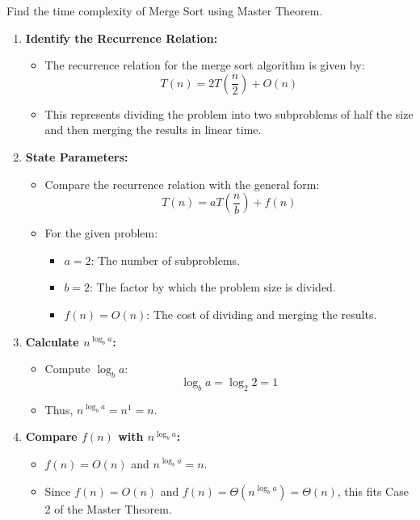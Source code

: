     \begin{example}
        Find the time complexity of Merge Sort using Master Theorem.
        \begin{enumerate}
            \item \textbf{Identify the Recurrence Relation:}
            \begin{itemize}
                \item The recurrence relation for the merge sort algorithm is given by:
                \[
                T(n) = 2T\left(\frac{n}{2}\right) + O(n)
                \]
                \item This represents dividing the problem into two subproblems of half the size and then merging the results in linear time.
            \end{itemize}
        
            \item \textbf{State Parameters:}
            \begin{itemize}
                \item Compare the recurrence relation with the general form:
                \[
                T(n) = aT\left(\frac{n}{b}\right) + f(n)
                \]
                \item For the given problem:
                \begin{itemize}
                    \item \( a = 2 \): The number of subproblems.
                    \item \( b = 2 \): The factor by which the problem size is divided.
                    \item \( f(n) = O(n) \): The cost of dividing and merging the results.
                \end{itemize}
            \end{itemize}
        
            \item \textbf{Calculate \( n^{\log_b a} \):}
            \begin{itemize}
                \item Compute \( \log_b a \):
                \[
                \log_b a = \log_2 2 = 1
                \]
                \item Thus, \( n^{\log_b a} = n^1 = n \).
            \end{itemize}
        
            \item \textbf{Compare \( f(n) \) with \( n^{\log_b a} \):}
            \begin{itemize}
                \item \( f(n) = O(n) \) and \( n^{\log_b a} = n \).
                \item Since \( f(n) = O(n) \) and \( f(n) = \Theta(n^{\log_b a}) = \Theta(n) \), this fits Case 2 of the Master Theorem.
            \end{itemize}
        

\end{enumerate}
\end{example}
